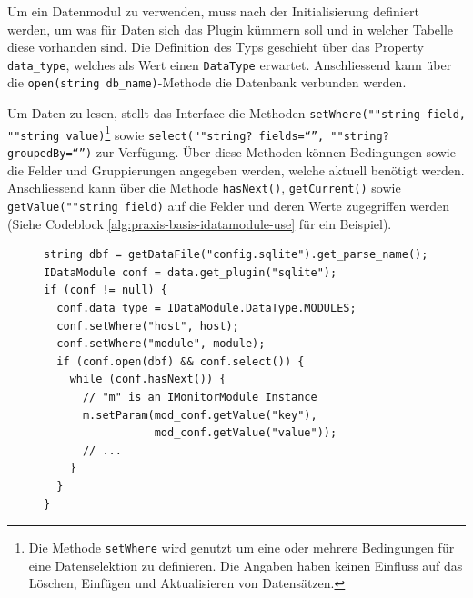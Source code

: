 Um ein Datenmodul zu verwenden, muss nach der Initialisierung definiert werden, um was f\"ur Daten sich das Plugin k\"ummern soll und in welcher Tabelle diese vorhanden sind. Die Definition des Typs geschieht \"uber das Property \texttt{data\_type}, welches als Wert einen \texttt{DataType} erwartet. Anschliessend kann \"uber die \texttt{open(string db\_name)}-Methode die Datenbank verbunden werden.

Um Daten zu lesen, stellt das Interface die Methoden \texttt{setWhere(""string field, ""string value)}\footnote{Die Methode \texttt{setWhere} wird genutzt um eine oder mehrere Bedingungen f\"ur eine Datenselektion zu definieren. Die Angaben haben keinen Einfluss auf das L\"oschen, Einf\"ugen und Aktualisieren von Datens\"atzen.} sowie \texttt{select(""string? fields="`"', ""string? groupedBy="`"')} zur Verf\"ugung. \"Uber diese Methoden k\"onnen Bedingungen sowie die Felder und Gruppierungen angegeben werden, welche aktuell ben\"otigt werden. Anschliessend kann \"uber die Methode \texttt{hasNext()}, \texttt{getCurrent()} sowie \texttt{getValue(""string field)} auf die Felder und deren Werte zugegriffen werden (Siehe Codeblock \ref{alg:praxis-basis-idatamodule-use} f\"ur ein Beispiel).

\begin{figure}[h]
 \lstset{language=[ISO]C++}
 \begin{lstlisting}[label=alg:praxis-basis-idatamodule-use,caption={[Beispiel zur Verwendung eines Datenmoduls]Beispiel: Verwendung eines Datenmoduls zum Auslesen aller Parameter zur Konfiguration eines \"Uberwachungsmodules. Nach dem das Modul geladen ist, wird definiert, dass Daten aus der \texttt{MODULES} Tabelle geladen werden sollen, und zwar nur jene, welche im Feld \texttt{host} und \texttt{module} entsprechende Werte beinhalten. \"Uber die Schlaufe und die Funktion \texttt{hasNext()} werden alle Datens\"atze ausgelesen und die Werte "`key"' und "`value"' zur Parametrierung eines anderen Modules genutzt.}]
string dbf = getDataFile("config.sqlite").get_parse_name();
IDataModule conf = data.get_plugin("sqlite");
if (conf != null) {
  conf.data_type = IDataModule.DataType.MODULES;
  conf.setWhere("host", host);
  conf.setWhere("module", module);
  if (conf.open(dbf) && conf.select()) {
    while (conf.hasNext()) {
      // "m" is an IMonitorModule Instance
      m.setParam(mod_conf.getValue("key"),
                 mod_conf.getValue("value"));
      // ...
    }
  }
}
 \end{lstlisting}
\end{figure}

